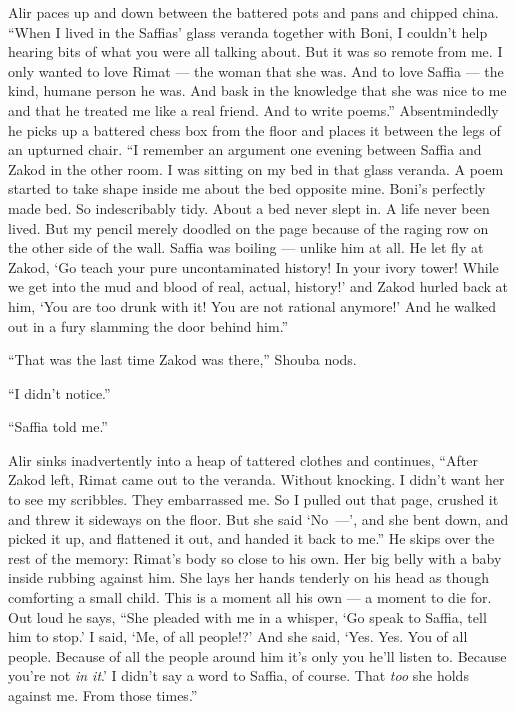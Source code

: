 \documentclass[twoside,11pt,openany]{book}
\begin{document}
Alir paces up and down between the battered pots and pans and chipped china. ``When I lived in the
Saffias{'} glass veranda together with Boni, I couldn't help hearing bits of what you were all talking about.  But
it was so remote from me. I only wanted to love Rimat --- the woman that she was. And to love Saffia --- the kind, humane
person he was. And bask in the knowledge that she was nice to me and that he treated me like a real friend. And to
write poems.'' Absentmindedly he picks up a battered chess box from the floor and places it between the
legs of an upturned chair. ``I remember an argument one evening between Saffia and Zakod in the other
room. I was sitting on my bed in that glass veranda. A poem started to take shape inside me about the bed
opposite mine.  Boni's perfectly made bed. So indescribably tidy. About a bed never slept in. A life never been
lived. But my pencil merely doodled on the page because of the raging row on the other side of the wall. Saffia was
boiling --- unlike him at all.  He let fly at Zakod, `Go teach your pure uncontaminated history! In your ivory tower!
While we get into the mud and blood of real, actual, history!' and Zakod hurled back at him, `You are too drunk with
it! You are not rational anymore!{}' And he walked out in a fury slamming the door behind him.''

``That was the last time Zakod was there,'' Shouba nods.

``I didn't notice.''

``Saffia told me.''

Alir sinks inadvertently into a heap of tattered clothes and continues, ``After Zakod left, Rimat came out
to the veranda. Without knocking. I didn't want her to see my scribbles. They embarrassed me. So I pulled out that
page, crushed it and threw it sideways on the floor.
But she said `No~---', and she bent down, and picked it up, and
flattened it out, and handed it back to me.'' He skips over the rest of the memory: Rimat's body so close
to his own. Her big belly with a baby inside rubbing against him. She lays her hands tenderly on his head as though
comforting a small child.  This is a moment all his own --- a moment to die for. Out loud he says, ``She
pleaded with me in a whisper, `Go speak to Saffia, tell him to stop.' I said, `Me, of all people!?' And she said,
`Yes. Yes. You of all people. Because of all the people around him it's only you he'll listen to. Because you're not
\textit{in it}.' I didn't say a word to Saffia, of course. That \textit{too} she holds against me. From those
times.''
\end{document}
